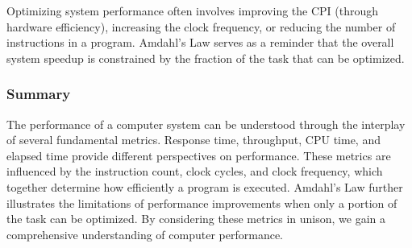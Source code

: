 Optimizing system performance often involves improving the CPI (through hardware efficiency), increasing the clock frequency, or reducing the number of instructions in a program. Amdahl's Law serves as a reminder that the overall system speedup is constrained by the fraction of the task that can be optimized.

\subsubsection{Summary}

The performance of a computer system can be understood through the interplay of several fundamental metrics. Response time, throughput, CPU time, and elapsed time provide different perspectives on performance. These metrics are influenced by the instruction count, clock cycles, and clock frequency, which together determine how efficiently a program is executed. Amdahl's Law further illustrates the limitations of performance improvements when only a portion of the task can be optimized. By considering these metrics in unison, we gain a comprehensive understanding of computer performance.
